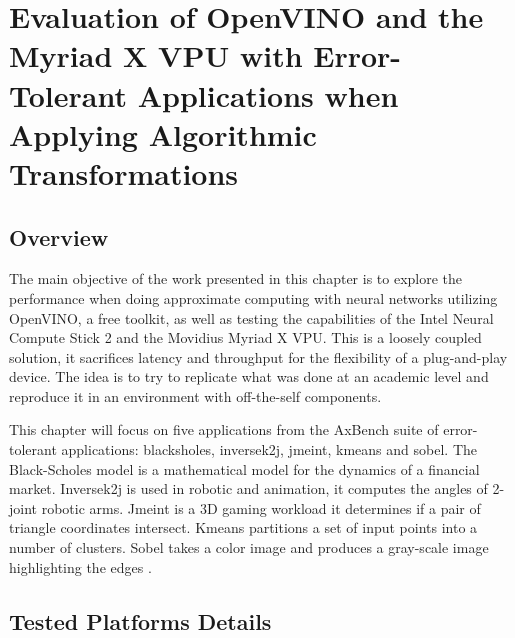 \chapter{Evaluation of OpenVINO and the Myriad X VPU with Error-Tolerant Applications when Applying Algorithmic Transformations}
\label{ch:ch1}

\section{Overview}


The main objective of the work presented in this chapter is to explore the performance when doing approximate computing with neural networks utilizing OpenVINO, a free toolkit, as well as testing the capabilities of the Intel Neural Compute Stick 2 and the Movidius Myriad X VPU. This is a loosely coupled solution, it sacrifices latency and throughput for the flexibility of a plug-and-play device. The idea is to try to replicate what was done at an academic level and reproduce it in an environment with off-the-self components.

This chapter will focus on five applications from the AxBench suite of error-tolerant applications: blacksholes, inversek2j, jmeint, kmeans and sobel. The Black-Scholes model is a mathematical model for the dynamics of a financial market. Inversek2j is used in robotic and animation, it computes the angles of 2-joint robotic arms. Jmeint is a 3D gaming workload it determines if a pair of triangle coordinates intersect. Kmeans partitions a set of input points into a number of clusters. Sobel takes a color image and produces a gray-scale image highlighting the edges \cite{Yazdanbakhsh2016}.

\section {Tested Platforms Details}

